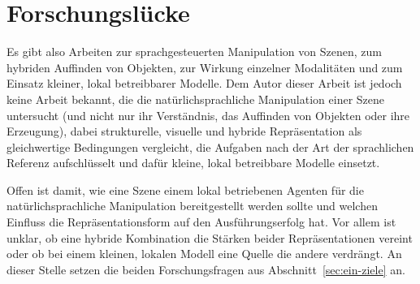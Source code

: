 \section{Forschungslücke}
\label{sec:grundlagen-luecke}

Es gibt also Arbeiten zur sprachgesteuerten Manipulation von Szenen, zum hybriden Auffinden von Objekten, zur Wirkung einzelner Modalitäten und zum Einsatz kleiner, lokal betreibbarer Modelle.
Dem Autor dieser Arbeit ist jedoch keine Arbeit bekannt, die die natürlichsprachliche Manipulation einer Szene untersucht (und nicht nur ihr Verständnis, das Auffinden von Objekten oder ihre Erzeugung), dabei strukturelle, visuelle und hybride Repräsentation als gleichwertige Bedingungen vergleicht, die Aufgaben nach der Art der sprachlichen Referenz aufschlüsselt und dafür kleine, lokal betreibbare Modelle einsetzt.

Offen ist damit, wie eine Szene einem lokal betriebenen Agenten für die natürlichsprachliche Manipulation bereitgestellt werden sollte und welchen Einfluss die Repräsentationsform auf den Ausführungserfolg hat.
Vor allem ist unklar, ob eine hybride Kombination die Stärken beider Repräsentationen vereint oder ob bei einem kleinen, lokalen Modell eine Quelle die andere verdrängt.
An dieser Stelle setzen die beiden Forschungsfragen aus Abschnitt~\ref{sec:ein-ziele} an.

